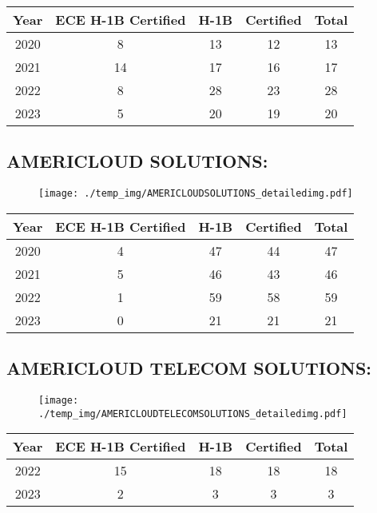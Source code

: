 \documentclass{article}%
\begin{document}
%
\begin{longtable}{c|c|c|c|c}%
\hline%
Year&ECE H{-}1B Certified&H{-}1B&Certified&Total\\%
\hline%
2020&8&13&12&13\\%
\hline%
2021&14&17&16&17\\%
\hline%
2022&8&28&23&28\\%
\hline%
2023&5&20&19&20\\%
\hline%
\end{longtable}

%
\newpage%
\subsection{AMERICLOUD SOLUTIONS:}%
\label{subsec:AMERICLOUDSOLUTIONS}%
\label{AMERICLOUDSOLUTIONSdetailed}%


\begin{figure}[htbp]%
\centering%
\texttt{[image: ./temp\_img/AMERICLOUDSOLUTIONS\_detailedimg.pdf]}%
\end{figure}

%
\begin{longtable}{c|c|c|c|c}%
\hline%
Year&ECE H{-}1B Certified&H{-}1B&Certified&Total\\%
\hline%
2020&4&47&44&47\\%
\hline%
2021&5&46&43&46\\%
\hline%
2022&1&59&58&59\\%
\hline%
2023&0&21&21&21\\%
\hline%
\end{longtable}

%
\newpage%
\subsection{AMERICLOUD TELECOM SOLUTIONS:}%
\label{subsec:AMERICLOUDTELECOMSOLUTIONS}%
\label{AMERICLOUDTELECOMSOLUTIONSdetailed}%


\begin{figure}[htbp]%
\centering%
\texttt{[image: ./temp\_img/AMERICLOUDTELECOMSOLUTIONS\_detailedimg.pdf]}%
\end{figure}

%
\begin{longtable}{c|c|c|c|c}%
\hline%
Year&ECE H{-}1B Certified&H{-}1B&Certified&Total\\%
\hline%
2022&15&18&18&18\\%
\hline%
2023&2&3&3&3\\%
\hline%
\end{longtable}
\end{document}
